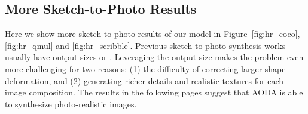 \documentclass[10pt,twocolumn,letterpaper]{article}
\begin{document}
\begin{table}[t]
\centering
{}
\caption{Results of quantitative evaluation and user preference study on QMUL-Sketch dataset. Best results are shown in \textbf{bold}.}
\label{tab:qmul}
\end{table}



\subsection{More Sketch-to-Photo Results}
\label{sec:s2p_syn}
Here we show more  sketch-to-photo results of our model in Figure~\ref{fig:hr_coco}, \ref{fig:hr_qmul} and \ref{fig:hr_scribble}. Previous sketch-to-photo synthesis works usually have output sizes  or . Leveraging the output size makes the problem even more challenging for two reasons: (1) the difficulty of correcting larger shape deformation, and (2) generating richer details and realistic textures for each image composition. The results in the following pages suggest that AODA is able to synthesize  photo-realistic images.
\end{document}
